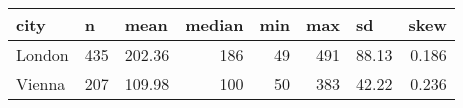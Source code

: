 \begin{tabular}{lrrrrrrr}
city  & \multicolumn{1}{l}{n} & \multicolumn{1}{l}{mean} & \multicolumn{1}{l}{median} & \multicolumn{1}{l}{min} & \multicolumn{1}{l}{max} & \multicolumn{1}{l}{sd} & \multicolumn{1}{l}{skew} \\
\midrule
London & 435   &         202.36      & 186   & 49    & 491   &         88.13      &         0.186      \\
Vienna & 207   &         109.98      & 100   & 50    & 383   &         42.22      &         0.236      \\
\bottomrule
\end{tabular}%
